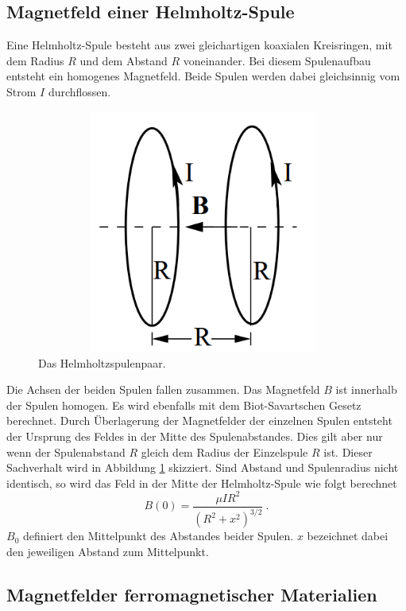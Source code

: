 \subsection{Magnetfeld einer Helmholtz-Spule}
Eine Helmholtz-Spule besteht aus zwei gleichartigen koaxialen Kreisringen,
mit dem Radius $R$ und dem Abstand $R$ voneinander. Bei diesem Spulenaufbau entsteht ein homogenes Magnetfeld.
Beide Spulen werden dabei gleichsinnig vom Strom $I$ durchflossen.

\begin{figure}
  \centering
  \includegraphics[width=11cm, height=8cm]{content/bilder/Spule2.PNG}
  \caption{Das Helmholtzspulenpaar.\cite{Anleitung}}
  \label{fig:Spule2}
\end{figure}

\noindent Die Achsen der beiden Spulen fallen zusammen.
Das Magnetfeld $B$ ist innerhalb der Spulen homogen.
Es wird ebenfalls mit dem Biot-Savartschen Gesetz berechnet.
Durch Überlagerung der Magnetfelder der einzelnen Spulen entsteht der Ursprung des Feldes in der Mitte des Spulenabstandes.
Dies gilt aber nur wenn der Spulenabstand $R$ gleich dem Radius der Einzelspule $R$ ist.
Dieser Sachverhalt wird in Abbildung \ref{fig:Spule2} skizziert.
Sind Abstand und Spulenradius nicht identisch, so wird das Feld in der Mitte der Helmholtz-Spule wie folgt berechnet
\begin{equation}
  B(0) = \frac{μ I R^2}{(R^2+x^2)^{3/2}} \:.
  \label{eqn:helmtheorie}
\end{equation}
$B_0$ definiert den Mittelpunkt des Abstandes beider Spulen.
$x$ bezeichnet dabei den jeweiligen Abstand zum Mittelpunkt.

\subsection{Magnetfelder ferromagnetischer Materialien}


